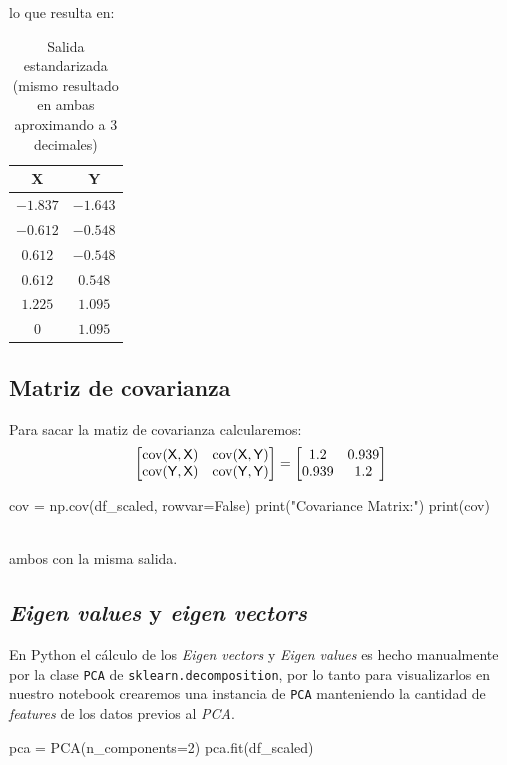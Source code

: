lo que resulta en:
\begin{table}[H]
\centering
\begin{tabular}{cc}
\sffamily X & \sffamily Y \\
\hline
\rowcolor[HTML]{EFEFEF} 
$-1.837$ & $-1.643$ \\
$-0.612$ & $-0.548$ \\
\rowcolor[HTML]{EFEFEF} 
$0.612$ & $-0.548$  \\
$0.612$ & $0.548$   \\
\rowcolor[HTML]{EFEFEF} 
$1.225$ & $1.095$   \\
$0$     & $1.095$
\end{tabular}
\caption{Salida estandarizada (mismo resultado en ambas aproximando a 3 decimales)}
\label{tab:standarized}
\end{table}

\subsection{Matriz de covarianza}
\begin{minipage}[c]{0.48\textwidth}
Para sacar la matiz de covarianza calcularemos:
\begin{equation*}
\begin{bmatrix}
\operatorname{cov}(\mathsf{X},\mathsf{X}) & \operatorname{cov}(\mathsf{X},\mathsf{Y})\\
\operatorname{cov}(\mathsf{Y},\mathsf{X}) & \operatorname{cov}(\mathsf{Y},\mathsf{Y})
\end{bmatrix}
=
\begin{bmatrix}
1.2 & 0.939\\
0.939 & 1.2
\end{bmatrix}
\end{equation*}
\end{minipage}
\hfill\vrule\hfill
\begin{minipage}[c]{0.48\textwidth}
\begin{jupyter}{4}
cov = np.cov(df_scaled, rowvar=False)
print("Covariance Matrix:")
print(cov)
\end{jupyter}
\end{minipage}\\
ambos con la misma salida.

\subsection{\textit{Eigen values} y \textit{eigen vectors}}\label{eigen}
En Python el cálculo de los \textit{Eigen vectors} y \textit{Eigen values} es hecho manualmente por la clase \texttt{PCA} de \texttt{sklearn.decomposition}, por lo tanto para visualizarlos en nuestro notebook crearemos una instancia de \texttt{PCA} manteniendo la cantidad de \textit{features} de los datos previos al \textit{PCA}.
\begin{jupyter}{5}
pca = PCA(n_components=2)
pca.fit(df_scaled)
\end{jupyter}
